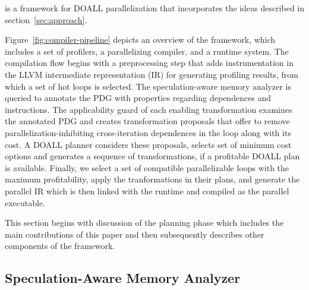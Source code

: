 %
\name is a framework for DOALL parallelization that incorporates the
ideas described in section~\ref{sec:approach}.


Figure~\ref{fig:compiler-pipeline} depicts an overview of the \name
framework, which includes a set of profilers, a parallelizing compiler,
and a runtime system.
%
The compilation flow begins with a preprocessing step that adds
instrumentation in the LLVM intermediate representation (IR) for
generating profiling results, from which a set of hot
loops is selected.
The speculation-aware memory analyzer
is queried to annotate the PDG with properties regarding dependences and
instructions. The applicability guard of each enabling
transformation examines the annotated PDG and creates transformation
proposals that offer to remove parallelization-inhibiting cross-iteration
dependences in the loop along with its cost. A DOALL planner considers
these proposals, selects set of minimum cost options and generates a sequence
of transformations, if a profitable DOALL plan is available.
Finally, we select a set of
compatible parallelizable loops with the maximum profitability, apply the
tranformations in their plans, and generate the parallel IR which is
then linked with the runtime and compiled as the parallel executable.

 This section begins with discussion of the planning phase which
 includes the main contributions of this paper and then subsequently
 describes other components of the framework.

\subsection{Speculation-Aware Memory Analyzer}
\label{sama}

%
%
%
%
%

